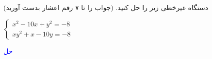 دستگاه غیرخطی زیر را حل کنید. (جواب را تا ۷ رقم اعشار بدست آورید)
\begin{center}
$
    \begin{cases}
    x^2 - 10x + y^2 = -8 \\
    xy^2 + x - 10y = -8
    \end{cases}
$
\end{center}
\textcolor{blue}{
حل
\\

}